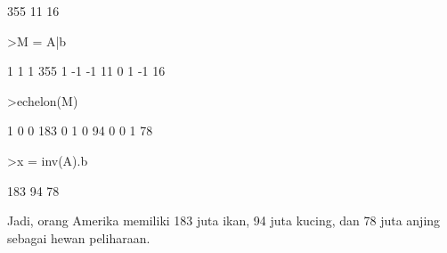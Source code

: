 \begin{eulernotebook}
\begin{euleroutput}
            355 
             11 
             16 
\end{euleroutput}
\begin{eulerprompt}
>M = A|b
\end{eulerprompt}
\begin{euleroutput}
              1             1             1           355 
              1            -1            -1            11 
              0             1            -1            16 
\end{euleroutput}
\begin{eulerprompt}
>echelon(M)
\end{eulerprompt}
\begin{euleroutput}
              1             0             0           183 
              0             1             0            94 
              0             0             1            78 
\end{euleroutput}
\begin{eulerprompt}
>x = inv(A).b
\end{eulerprompt}
\begin{euleroutput}
            183 
             94 
             78 
\end{euleroutput}
\begin{eulercomment}
Jadi, orang Amerika memiliki 183 juta ikan, 94 juta kucing, dan 78
juta anjing sebagai hewan peliharaan.
\end{eulercomment}

\end{eulernotebook}

